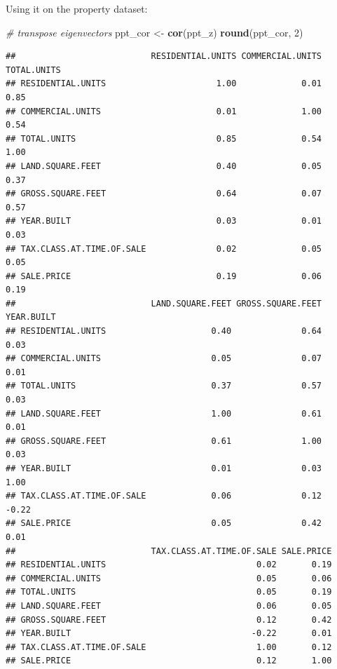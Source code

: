 \documentclass[]{article}
\newenvironment{Shaded}{\begin{snugshade}}{\end{snugshade}}
\newcommand{\CommentTok}[1]{\textcolor[rgb]{0.56,0.35,0.01}{\textit{#1}}}
\newcommand{\DecValTok}[1]{\textcolor[rgb]{0.00,0.00,0.81}{#1}}
\newcommand{\KeywordTok}[1]{\textcolor[rgb]{0.13,0.29,0.53}{\textbf{#1}}}
\newcommand{\NormalTok}[1]{#1}
\newcommand{\StringTok}[1]{\textcolor[rgb]{0.31,0.60,0.02}{#1}}
\begin{document}
Using it on the property dataset:

\begin{Shaded}
\begin{Highlighting}[]
\CommentTok{# transpose eigenvectors}
\NormalTok{ppt_cor <-}\StringTok{ }\KeywordTok{cor}\NormalTok{(ppt_z)}
\KeywordTok{round}\NormalTok{(ppt_cor, }\DecValTok{2}\NormalTok{)}
\end{Highlighting}
\end{Shaded}

\begin{verbatim}
##                           RESIDENTIAL.UNITS COMMERCIAL.UNITS TOTAL.UNITS
## RESIDENTIAL.UNITS                      1.00             0.01        0.85
## COMMERCIAL.UNITS                       0.01             1.00        0.54
## TOTAL.UNITS                            0.85             0.54        1.00
## LAND.SQUARE.FEET                       0.40             0.05        0.37
## GROSS.SQUARE.FEET                      0.64             0.07        0.57
## YEAR.BUILT                             0.03             0.01        0.03
## TAX.CLASS.AT.TIME.OF.SALE              0.02             0.05        0.05
## SALE.PRICE                             0.19             0.06        0.19
##                           LAND.SQUARE.FEET GROSS.SQUARE.FEET YEAR.BUILT
## RESIDENTIAL.UNITS                     0.40              0.64       0.03
## COMMERCIAL.UNITS                      0.05              0.07       0.01
## TOTAL.UNITS                           0.37              0.57       0.03
## LAND.SQUARE.FEET                      1.00              0.61       0.01
## GROSS.SQUARE.FEET                     0.61              1.00       0.03
## YEAR.BUILT                            0.01              0.03       1.00
## TAX.CLASS.AT.TIME.OF.SALE             0.06              0.12      -0.22
## SALE.PRICE                            0.05              0.42       0.01
##                           TAX.CLASS.AT.TIME.OF.SALE SALE.PRICE
## RESIDENTIAL.UNITS                              0.02       0.19
## COMMERCIAL.UNITS                               0.05       0.06
## TOTAL.UNITS                                    0.05       0.19
## LAND.SQUARE.FEET                               0.06       0.05
## GROSS.SQUARE.FEET                              0.12       0.42
## YEAR.BUILT                                    -0.22       0.01
## TAX.CLASS.AT.TIME.OF.SALE                      1.00       0.12
## SALE.PRICE                                     0.12       1.00
\end{verbatim}
\end{document}
